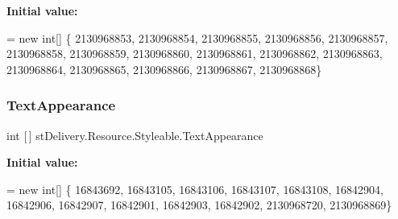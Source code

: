 {\bfseries Initial value\+:}
\begin{DoxyCode}
= \textcolor{keyword}{new} \textcolor{keywordtype}{int}[] \{
                    2130968853,
                    2130968854,
                    2130968855,
                    2130968856,
                    2130968857,
                    2130968858,
                    2130968859,
                    2130968860,
                    2130968861,
                    2130968862,
                    2130968863,
                    2130968864,
                    2130968865,
                    2130968866,
                    2130968867,
                    2130968868\}
\end{DoxyCode}
\mbox{\label{classst_delivery_1_1_resource_1_1_styleable_a71d968e448b896c37a8acd1c779994d7}} 
\subsubsection{\texorpdfstring{Text\+Appearance}{TextAppearance}}
{\footnotesize\ttfamily int \mbox{[}$\,$\mbox{]} st\+Delivery.\+Resource.\+Styleable.\+Text\+Appearance\hspace{0.3cm}{\ttfamily [static]}}

{\bfseries Initial value\+:}
\begin{DoxyCode}
= \textcolor{keyword}{new} \textcolor{keywordtype}{int}[] \{
                    16843692,
                    16843105,
                    16843106,
                    16843107,
                    16843108,
                    16842904,
                    16842906,
                    16842907,
                    16842901,
                    16842903,
                    16842902,
                    2130968720,
                    2130968869\}
\end{DoxyCode}
\mbox{\label{classst_delivery_1_1_resource_1_1_styleable_ad81edf69dcd7d5252705e62c7ea00818}} 
